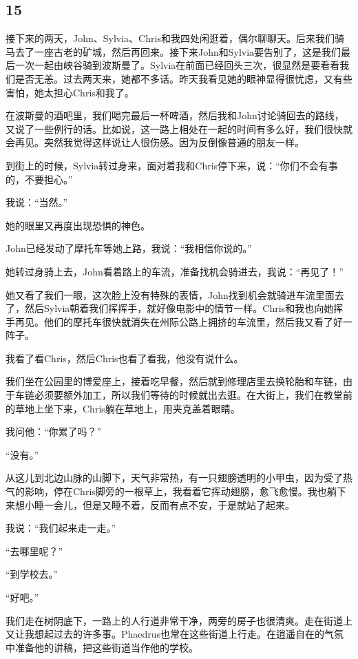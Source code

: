 \documentclass[UTF8]{article}
\begin{document}
\subsection*{15}
\par 接下来的两天，John、Sylvia、Chris和我四处闲逛着，偶尔聊聊天。后来我们骑马去了一座古老的矿城，然后再回来。接下来John和Sylvia要告别了，这是我们最后一次一起由峡谷骑到波斯曼了。Sylvia在前面已经回头三次，很显然是要看看我们是否无恙。过去两天来，她都不多话。昨天我看见她的眼神显得很忧虑，又有些害怕，她太担心Chris和我了。
\par 在波斯曼的酒吧里，我们喝完最后一杯啤酒，然后我和John讨论骑回去的路线，又说了一些例行的话。比如说，这一路上相处在一起的时间有多么好，我们很快就会再见。突然我觉得这样说让人很伤感。因为反倒像普通的朋友一样。
\par 到街上的时候，Sylvia转过身来，面对着我和Chris停下来，说：“你们不会有事的，不要担心。”
\par 我说：“当然。”
\par 她的眼里又再度出现恐惧的神色。
\par John已经发动了摩托车等她上路，我说：“我相信你说的。”
\par 她转过身骑上去，John看着路上的车流，准备找机会骑进去，我说：“再见了！”
\par 她又看了我们一眼，这次脸上没有特殊的表情，John找到机会就骑进车流里面去了，然后Sylvia朝着我们挥挥手，就好像电影中的情节一样。Chris和我也向她挥手再见。他们的摩托车很快就消失在州际公路上拥挤的车流里，然后我又看了好一阵子。
\par 我看了看Chris，然后Chris也看了看我，他没有说什么。
\par 我们坐在公园里的博爱座上，接着吃早餐，然后就到修理店里去换轮胎和车链，由于车链必须要额外加工，所以我们等待的时候就出去逛。在大街上，我们在教堂前的草地上坐下来，Chris躺在草地上，用夹克盖着眼睛。
\par 我问他：“你累了吗？”
\par “没有。”
\par 从这儿到北边山脉的山脚下，天气非常热，有一只翅膀透明的小甲虫，因为受了热气的影响，停在Chris脚旁的一根草上，我看着它挥动翅膀，愈飞愈慢。我也躺下来想小睡一会儿，但是又睡不着，反而有点不安，于是就站了起来。
\par 我说：“我们起来走一走。”
\par “去哪里呢？”
\par “到学校去。”
\par “好吧。”
\par 我们走在树阴底下，一路上的人行道非常干净，两旁的房子也很清爽。走在街道上又让我想起过去的许多事。Phaedrus也常在这些街道上行走。在逍遥自在的气氛中准备他的讲稿，把这些街道当作他的学校。
\end{document}
